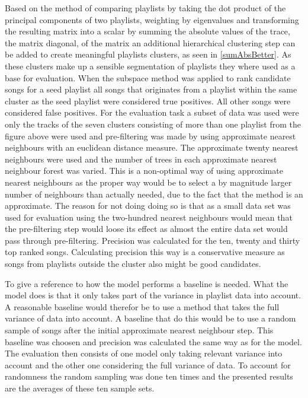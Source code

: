 \documentclass[a4paper,11pt]{kth-mag}
\begin{document}
Based on the method of comparing playlists by taking the dot product of the principal components of two playlists, weighting by eigenvalues and transforming the resulting matrix into a scalar by summing the absolute values of the trace, the matrix diagonal, of the matrix an additional hierarchical clustering step can be added to create meaningful playlists clusters, as seen in \ref{sumAbsBetter}. As these clusters make up a sensible segmentation of playlists they where used as a base for evaluation. When the subspace method was applied to rank candidate songs for a seed playlist all songs that originates from a playlist within the same cluster as the seed playlist were considered true positives. All other songs were considered false positives. For the evaluation task a subset of data was used were only the tracks of the seven clusters consisting of more than one playlist from the figure above were used and pre-filtering was made by using approximate nearest neighbours with an euclidean distance measure. The approximate twenty nearest neighbours were used and the number of trees in each approximate nearest neighbour forest was varied. This is a non-optimal way of using approximate nearest neighbours as the proper way would be to select a by magnitude larger number of neighbours than actually needed, due to the fact that the method is an approximate. The reason for not doing doing so is that as a small data set was used for evaluation using the two-hundred nearest neighbours would mean that the pre-filtering step would loose its effect as almost the entire data set would pass through pre-filtering. 
Precision was calculated for the ten, twenty and thirty top ranked songs. Calculating precision this way is a conservative measure as songs from playlists outside the cluster also might be good candidates. 

To give a reference to how the model performs a baseline is needed. What the model does is that it only takes part of the variance in playlist data into account. A reasonable baseline would therefor be to use a method that takes the full variance of data into account. A baseline that do this would be to use a random sample of songs after the initial approximate nearest neighbour step. This baseline was choosen and precision was calculated the same way as for the model. The evaluation then consists of one model only taking relevant variance into account and the other one considering the full variance of data. To account for randomness the random sampling was done ten times and the presented results are the averages of these ten sample sets.
\end{document}

